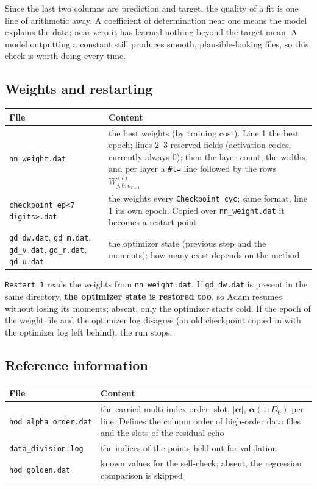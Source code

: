 \documentclass[10pt,a4paper]{article}
\newcommand{\code}[1]{\texttt{#1}}
\newcommand{\mi}[1]{\boldsymbol{#1}}
\begin{document}
Since the last two columns are prediction and target, the quality of
a fit is one line of arithmetic away. A coefficient of determination
near one means the model explains the data; near zero it has learned
nothing beyond the target mean. A model outputting a constant still
produces smooth, plausible-looking files, so this check is worth
doing every time.

\subsection{Weights and restarting}
\label{sec:restart}

\begin{longtable}{@{}p{}p{}@{}}
\toprule
File & Content \\
\midrule
\endhead
\code{nn\_weight.dat} & the best weights (by training cost). Line 1 the best epoch; lines 2--3 reserved fields (activation codes, currently always 0); then the layer count, the widths, and per layer a \code{\#l=} line followed by the rows $W^{(l)}_{j,0:n_{l-1}}$\\
\code{checkpoint\_ep<7 digits>.dat} & the weights every \code{Checkpoint\_cyc}; same format, line 1 its own epoch. Copied over \code{nn\_weight.dat} it becomes a restart point\\
\code{gd\_dw.dat}, \code{gd\_m.dat}, \code{gd\_v.dat}, \code{gd\_r.dat}, \code{gd\_u.dat} & the optimizer state (previous step and the moments); how many exist depends on the method\\
\bottomrule
\end{longtable}

\code{Restart 1} reads the weights from \code{nn\_weight.dat}. If
\code{gd\_dw.dat} is present in the same directory, \textbf{the
optimizer state is restored too}, so Adam resumes without losing its
moments; absent, only the optimizer starts cold. If the epoch of the
weight file and the optimizer log disagree (an old checkpoint copied
in with the optimizer log left behind), the run stops.

\subsection{Reference information}

\begin{longtable}{@{}p{}p{}@{}}
\toprule
File & Content \\
\midrule
\endhead
\code{hod\_alpha\_order.dat} & the carried multi-index order: slot, $|\mi\alpha|$, $\mi\alpha(1{:}D_0)$ per line. Defines the column order of high-order data files and the slots of the residual echo\\
\code{data\_division.log} & the indices of the points held out for validation\\
\code{hod\_golden.dat} & known values for the self-check; absent, the regression comparison is skipped\\
\bottomrule
\end{longtable}
\end{document}
